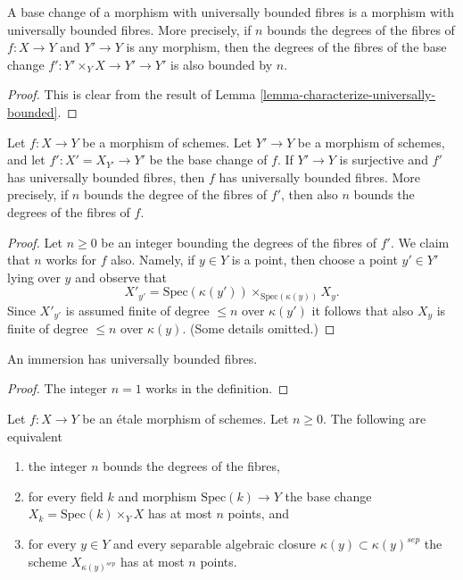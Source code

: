 \begin{lemma}
\label{lemma-base-change-universally-bounded}
A base change of a morphism with universally bounded fibres is
a morphism with universally bounded fibres. More precisely, if
$n$ bounds the degrees of the fibres of $f : X \to Y$ and $Y' \to Y$
is any morphism, then the degrees of the fibres of the base change
$f' : Y' \times_Y X \to Y' \to Y'$ is also bounded by $n$.
\end{lemma}

\begin{proof}
This is clear from the result of
Lemma \ref{lemma-characterize-universally-bounded}.
\end{proof}

\begin{lemma}
\label{lemma-descent-universally-bounded}
Let $f : X \to Y$ be a morphism of schemes.
Let $Y' \to Y$ be a morphism of schemes, and let
$f' : X' = X_{Y'} \to Y'$ be the base change of $f$.
If $Y' \to Y$ is surjective and $f'$ has universally bounded fibres,
then $f$ has universally bounded fibres. More precisely, if $n$ bounds
the degree of the fibres of $f'$, then also $n$ bounds the degrees
of the fibres of $f$.
\end{lemma}

\begin{proof}
Let $n \geq 0$ be an integer bounding the degrees of the fibres of $f'$.
We claim that $n$ works for $f$ also. Namely, if $y \in Y$ is a point,
then choose a point $y' \in Y'$ lying over $y$ and observe that
$$
X'_{y'} = \text{Spec}(\kappa(y')) \times_{\text{Spec}(\kappa(y))} X_y.
$$
Since $X'_{y'}$ is assumed finite of degree $\leq n$ over $\kappa(y')$
it follows that also $X_y$ is finite of degree $\leq n$ over $\kappa(y)$.
(Some details omitted.)
\end{proof}

\begin{lemma}
\label{lemma-immersion-universally-bounded}
An immersion has universally bounded fibres.
\end{lemma}

\begin{proof}
The integer $n = 1$ works in the definition.
\end{proof}

\begin{lemma}
\label{lemma-etale-universally-bounded}
Let $f : X \to Y$ be an \'etale morphism of schemes.
Let $n \geq 0$. The following are equivalent
\begin{enumerate}
\item the integer $n$ bounds the degrees of the fibres,
\item for every field $k$ and morphism $\text{Spec}(k) \to Y$ the
base change $X_k = \text{Spec}(k) \times_Y X$ has at most $n$ points, and
\item for every $y \in Y$ and every separable algebraic closure
$\kappa(y) \subset \kappa(y)^{sep}$ the scheme
$X_{\kappa(y)^{sep}}$ has at most $n$ points.
\end{enumerate}
\end{lemma}

